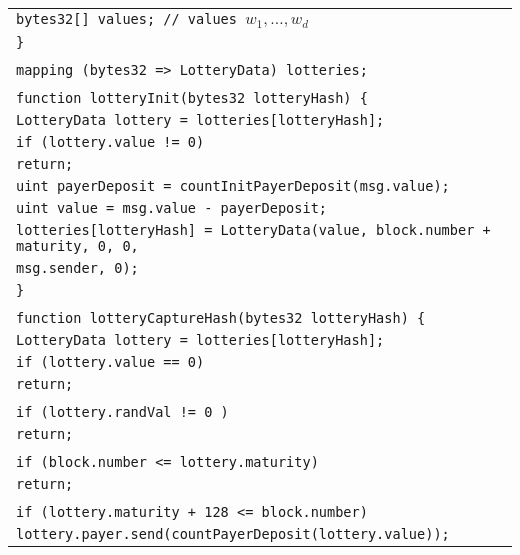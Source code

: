 \documentclass[a4paper]{article}
\begin{document}
\begin{tabularx}{\linewidth}{l}
        \qquad\qquad\texttt{bytes32[] values;   // values $w_1, \ldots, w_d$}\\
        \qquad\texttt{\}}\\
        \\
        \qquad\texttt{mapping (bytes32 => LotteryData) lotteries;}\\
        \\
        \qquad\texttt{function lotteryInit(bytes32 lotteryHash) \{}\\
        \qquad\qquad\texttt{LotteryData lottery = lotteries[lotteryHash];}\\
        \qquad\qquad\texttt{if (lottery.value != 0)}\\
        \qquad\qquad\qquad\texttt{return;}\\
        \qquad\qquad\texttt{uint payerDeposit = countInitPayerDeposit(msg.value);}\\
        \qquad\qquad\texttt{uint value = msg.value - payerDeposit;}\\
        \qquad\qquad\texttt{lotteries[lotteryHash] = LotteryData(value, block.number + maturity, 0, 0,}\\
        \qquad\qquad\qquad\qquad\qquad\qquad\qquad\qquad\qquad\qquad\qquad\qquad\texttt{msg.sender, 0);}\\
        \qquad\texttt{\}}\\
        \\
        \qquad\texttt{function lotteryCaptureHash(bytes32 lotteryHash) \{}\\
        \qquad\qquad\texttt{LotteryData lottery = lotteries[lotteryHash];}\\
        \qquad\qquad\texttt{if (lottery.value == 0)}\\
        \qquad\qquad\qquad\texttt{return;}\\
        \\
        \qquad\qquad\texttt{if (lottery.randVal != 0 )}\\
        \qquad\qquad\qquad\texttt{return;}\\
        \\
        \qquad\qquad\texttt{if (block.number <= lottery.maturity)}\\
        \qquad\qquad\qquad\texttt{return;}\\
        \\
        \qquad\qquad\texttt{if (lottery.maturity + 128 <= block.number)}\\
        \qquad\qquad\qquad\texttt{lottery.payer.send(countPayerDeposit(lottery.value));}\\

\end{tabularx}
\end{document}
